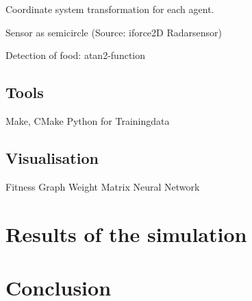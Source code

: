 \documentclass[10pt,a4paper,DIV=11]{scrreprt}
\begin{document}
Coordinate system transformation for each agent.

Sensor as semicircle (Source: iforce2D Radarsensor)

Detection of food: atan2-function

\section{Tools}
Make, CMake
Python for Trainingdata

\section{Visualisation}

Fitness Graph
Weight Matrix
Neural Network






\chapter{Results of the simulation}

\chapter{Conclusion}





\newpage


\listoffigures
\listoftables
\listofalgorithms
\lstlistoflistings

\newpage











\end{document}
